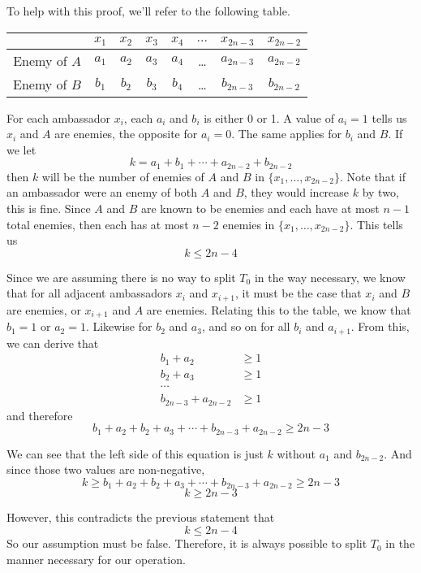 \documentclass[12pt]{article}
\begin{document}
\newpage
To help with this proof, we'll refer to the following table.
\begin{center}
    \begin{tabular}{r|c c c c c c c}
         & $x_1$ & $x_2$ & $x_3$ & $x_4$ & $\dots$ & $x_{2n-3}$ & $x_{2n-2}$  \\
         \hline
        Enemy of $A$ & $a_1$ & $a_2$ & $a_3$ & $a_4$ & \dots & $a_{2n-3}$ & $a_{2n-2}$ \\
        Enemy of $B$ & $b_1$ & $b_2$ & $b_3$ & $b_4$ & \dots & $b_{2n-3}$ & $b_{2n-2}$ \\
    \end{tabular}
\end{center}

For each ambassador $x_i$, each $a_i$ and $b_i$ is either 0 or 1. A value of $a_i=1$ tells us $x_i$ and $A$ are enemies, the opposite for $a_i=0$. The same applies for $b_i$ and $B$. If we let
\[k = a_1 + b_1 + \cdots + a_{2n-2} + b_{2n-2}\]
then $k$ will be the number of enemies of $A$ and $B$ in $\{x_1,\dots,x_{2n-2}\}$. Note that if an ambassador were an enemy of both $A$ and $B$, they would increase $k$ by two, this is fine. Since $A$ and $B$ are known to be enemies and each have at most $n-1$ total enemies, then each has at most $n-2$ enemies in $\{x_1,\dots,x_{2n-2}\}$. This tells us
\[k \leq 2n-4\]

Since we are assuming there is no way to split $T_0$ in the way necessary, we know that for all adjacent ambassadors $x_i$ and $x_{i+1}$, it must be the case that $x_i$ and $B$ are enemies, or $x_{i+1}$ and $A$ are enemies. Relating this to the table, we know that $b_1=1$ or $a_2=1$. Likewise for $b_2$ and $a_3$, and so on for all $b_i$ and $a_{i+1}$. From this, we can derive that
\begin{align*}
    b_1 + a_2 &\geq 1 \\
    b_2 + a_3 &\geq 1 \\
    \cdots \\
    b_{2n-3} + a_{2n-2} & \geq 1
\end{align*}
and therefore
\[b_1 + a_2 + b_2 + a_3 + \cdots + b_{2n-3} + a_{2n-2} \geq 2n-3\]

We can see that the left side of this equation is just $k$ without $a_1$ and $b_{2n-2}$. And since those two values are non-negative, 
\[k \geq b_1 + a_2 + b_2 + a_3 + \cdots + b_{2n-3} + a_{2n-2} \geq 2n-3\]
\[k \geq 2n-3\]

However, this contradicts the previous statement that 
\[k \leq 2n-4\]
So our assumption must be false. Therefore, it is always possible to split $T_0$ in the manner necessary for our operation.
\end{document}
